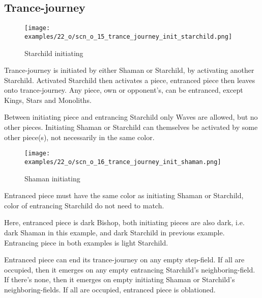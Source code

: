 \subsection*{Trance-journey}

\vspace*{-0.9\baselineskip}
\noindent
\begin{wrapfigure}[11]{l}{0.4\textwidth}
\centering
\texttt{[image: examples/22\_o/scn\_o\_15\_trance\_journey\_init\_starchild.png]}
\caption{Starchild initiating}
\label{fig:scn_o_15_trance_journey_init_starchild}
\end{wrapfigure}
Trance-journey is initiated by either Shaman or Starchild, by activating another Starchild.
Activated Starchild then activates a piece, entranced piece then leaves onto trance-journey.
Any piece, own or opponent's, can be entranced, except Kings, Stars and Monoliths.

Between initiating piece and entrancing Starchild only Waves are allowed, but no other pieces.
Initiating Shaman or Starchild can themselves be activated by some other piece(s), not necessarily
in the same color.

\vspace*{-0.1\baselineskip}
\noindent
\begin{wrapfigure}[10]{l}{0.4\textwidth}
\centering
\texttt{[image: examples/22\_o/scn\_o\_16\_trance\_journey\_init\_shaman.png]}
\caption{Shaman initiating}
\label{fig:scn_o_16_trance_journey_init_shaman}
\end{wrapfigure}
Entranced piece must have the same color as initiating Shaman or Starchild, color of
entrancing Starchild do not need to match.

Here, entranced piece is dark Bishop, both initiating pieces are also dark, i.e. dark Shaman
in this example, and dark Starchild in previous example. Entrancing piece in both examples
is light Starchild.

Entranced piece can end its trance-journey on any empty step-field. If all are occupied, then it emerges
on any empty entrancing Starchild's neighboring-field. If there's none, then it emerges on empty initiating
Shaman or Starchild's neighboring-fields. If all are occupied, entranced piece is oblationed.

